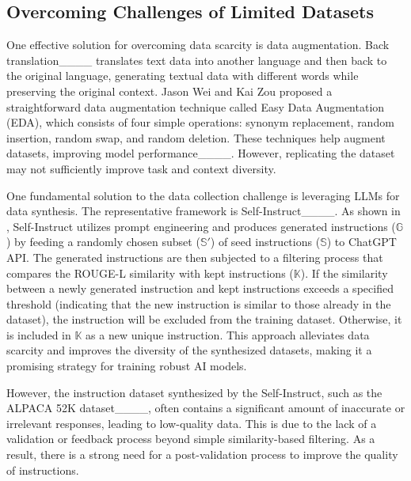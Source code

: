 \subsection{Overcoming Challenges of Limited Datasets}
One effective solution for overcoming data scarcity is data augmentation.
Back translation____ translates text data into
another language and then back to the original language, generating textual data
with different words while preserving the original context. Jason Wei and Kai
Zou proposed a straightforward data augmentation technique called
Easy Data Augmentation (EDA), which consists of four simple operations: synonym
replacement, random insertion, random swap, and random deletion. These
techniques help augment datasets, improving model performance____. However,
replicating the dataset may not sufficiently improve task and context diversity.

One fundamental solution to the data collection challenge is leveraging
LLMs for data synthesis. 
The representative framework is Self-Instruct____. 
As shown in ,
Self-Instruct utilizes prompt engineering
and produces generated instructions ($\mathbb{G}$) by feeding
a randomly chosen subset ($\mathbb{S}'$) of seed instructions ($\mathbb{S}$) 
to ChatGPT API.
The generated instructions are then subjected
to a filtering process that compares the ROUGE-L similarity
with kept instructions ($\mathbb{K}$).
If the similarity between a newly generated
instruction and kept instructions exceeds
a specified threshold (indicating
that the new instruction is %
similar to those already in the dataset),
the instruction will be excluded from the training dataset.
Otherwise, it is included in $\mathbb{K}$ as a new unique instruction.
This approach %
alleviates data scarcity %
and improves
the diversity of the synthesized datasets, making it a promising strategy for
training robust AI models.

However, the instruction dataset synthesized by the Self-Instruct,
such as the ALPACA 52K dataset____, often contains a significant amount of 
inaccurate or irrelevant responses, leading to low-quality data.
This is due to the lack of a validation or feedback process beyond
simple similarity-based filtering. 
As a result, there is a strong need 
for a post-validation process to improve the quality of instructions.

